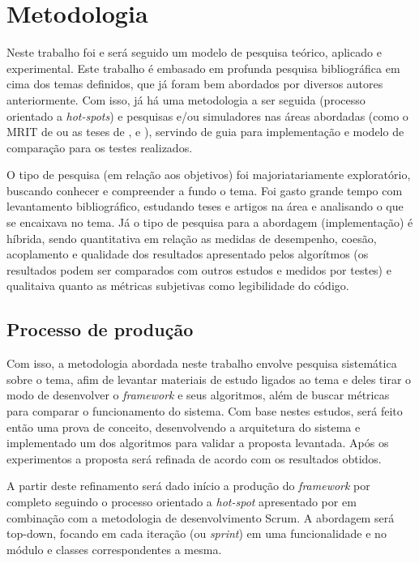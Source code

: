 \chapter[Metodologia]{Metodologia}

Neste trabalho foi e será seguido um modelo de pesquisa teórico, aplicado e experimental. Este trabalho é embasado em profunda pesquisa bibliográfica em cima dos temas definidos, que já foram bem abordados por diversos autores anteriormente. Com isso, já há uma metodologia a ser seguida (processo orientado a \textit{hot-spots}) e pesquisas e/ou simuladores nas áreas abordadas (como o MRIT de \cite{Guzman2008} ou as teses de \cite{Souza2008}, \cite{Thomsen2010} e \cite{Strandberg2004}), servindo de guia para implementação e modelo de comparação para os testes realizados.

O tipo de pesquisa (em relação aos objetivos) foi majoriatariamente exploratório, buscando conhecer e compreender a fundo o tema. Foi gasto grande tempo com levantamento bibliográfico, estudando teses e artigos na área e analisando o que se encaixava no tema. Já o tipo de pesquisa para a abordagem (implementação) é híbrida, sendo quantitativa em relação as medidas de desempenho, coesão, acoplamento e qualidade dos resultados apresentado pelos algorítmos (os resultados podem ser comparados com outros estudos e medidos por testes) e qualitaiva quanto as métricas subjetivas como legibilidade do código.

\section{Processo de produção}

Com isso, a metodologia abordada neste trabalho envolve pesquisa sistemática sobre o tema, afim de levantar materiais de estudo ligados ao tema e deles tirar o modo de desenvolver o \textit{framework} e seus algoritmos, além de buscar métricas para comparar o funcionamento do sistema. Com base nestes estudos, será feito então uma prova de conceito, desenvolvendo a arquitetura do sistema e implementado um dos algoritmos para validar a proposta levantada. Após os experimentos a proposta será refinada de acordo com os resultados obtidos.

A partir deste refinamento será dado início a produção do \textit{framework} por completo seguindo o processo orientado a \textit{hot-spot} apresentado por \cite{Fayad1999} em combinação com a metodologia de desenvolvimento Scrum. A abordagem será top-down, focando em cada iteração (ou \textit{sprint}) em uma funcionalidade e no módulo e classes correspondentes a mesma. 

